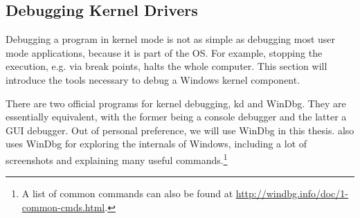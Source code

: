\subsection{Debugging Kernel Drivers}
\label{chap:background.kerneldriver.debugging}
Debugging a program in kernel mode is not as simple as debugging most user mode applications, because it is part of the OS. For example, stopping the execution, e.g. via break points, halts the whole computer. This section will introduce the tools necessary to debug a Windows kernel component.

There are two official programs for kernel debugging, kd and WinDbg. They are essentially equivalent, with the former being a console debugger and the latter a GUI debugger. Out of personal preference, we will use WinDbg in this thesis. \cite{Yosifovich2017} also uses WinDbg for exploring the internals of Windows, including a lot of screenshots and explaining many useful commands.\footnote{\label{fn:background.kerneldriver.windbg} A list of common commands can also be found at \url{http://windbg.info/doc/1-common-cmds.html}.} \\

